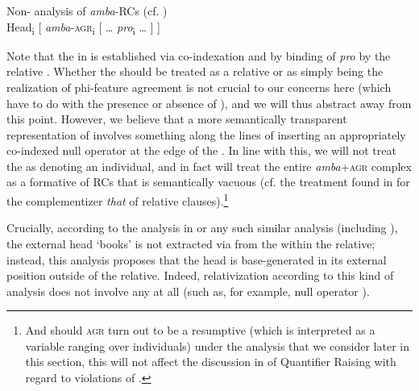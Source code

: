 \documentclass[output=paper,modfonts,nonflat,
colorlinks, citecolor=brown,
]{langsci/langscibook}
\begin{document}
  
\ea\label{ex:gould:2}
Non- analysis of \textit{amba}{}-RCs (cf. \citealt{Keach2004})\\
Head\textsubscript{i} [ \textit{amba}{}-\textsc{agr}\textsubscript{i} [ … \textit{pro}\textsubscript{i} … ] ]
\z

  
Note that the  in  is established via co-indexa\-tion and by binding of \textit{pro} by the relative . Whether the  should be treated as a relative  or as simply being the realization of phi-feature agreement is not crucial to our concerns here (which have to do with the presence or absence of ), and we will thus abstract away from this point. However, we believe that a more semantically transparent representation of  involves something along the lines of inserting an appropriately co-indexed null operator at the edge of the . In line with this, we will not treat the  as denoting an individual, and in fact will treat the entire \textit{amba}+\textsc{agr} complex as a formative of RCs that is semantically vacuous (cf. the treatment found in \citet{Heim1998} for the complementizer \textit{that} of  relative clauses).\footnote{And should \textsc{agr} turn out to be a resumptive  (which is interpreted as a variable ranging over individuals) under the  analysis that we consider later in this section, this will not affect the discussion in  of Quantifier Raising with regard to violations of .}

Crucially, according to the analysis in  or any such similar analysis (including \citealt{Barrett-Keach1985}), the external head ‘books’ is not extracted via  from the  within the relative; instead, this analysis proposes that the head is base-generated in its external position outside of the relative. Indeed, relativization according to this kind of analysis does not involve any  at all (such as, for example, null operator ).
\end{document}
